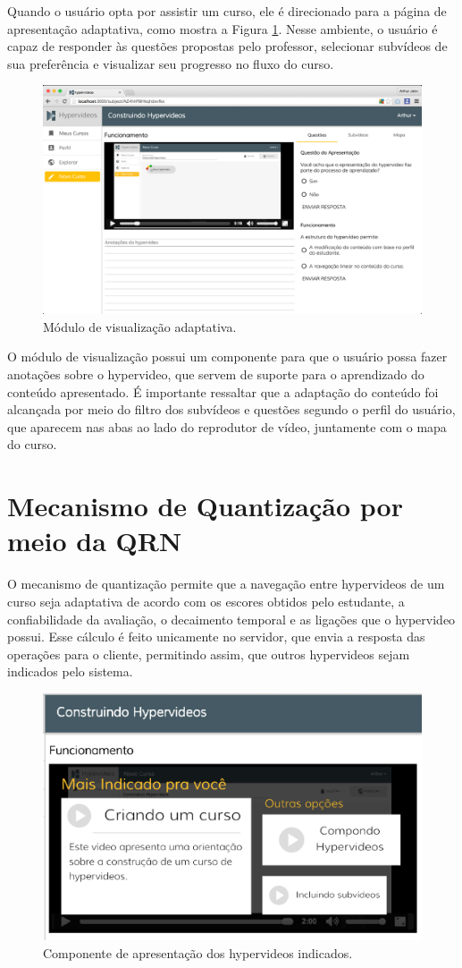 Quando o usuário opta por assistir um curso, ele é direcionado para a página de apresentação adaptativa, como mostra a Figura \ref{fig:apresentar}. Nesse ambiente, o usuário é capaz de responder às questões propostas pelo professor, selecionar subvídeos de sua preferência e visualizar seu progresso no fluxo do curso.

\begin{figure}[h!]
  	\centering
  	\includegraphics[width=.9\linewidth]{figuras/apresentar.eps}
  	\caption{Módulo de visualização adaptativa.}
  	\label{fig:apresentar}
\end{figure}

O módulo de visualização possui um componente para que o usuário possa fazer anotações sobre o hypervideo, que servem de suporte para o aprendizado do conteúdo apresentado. É importante ressaltar que a adaptação do conteúdo foi alcançada por meio do filtro dos subvídeos e questões segundo o perfil do usuário, que aparecem nas abas ao lado do reprodutor de vídeo, juntamente com o mapa do curso.

\section{Mecanismo de Quantização por meio da QRN}

O mecanismo de quantização permite que a navegação entre hypervideos de um curso seja adaptativa de acordo com os escores obtidos pelo estudante, a confiabilidade da avaliação, o decaimento temporal e as ligações que o hypervideo possui. Esse cálculo é feito unicamente no servidor, que envia a resposta das operações para o cliente, permitindo assim, que outros hypervideos sejam indicados pelo sistema. 

\begin{figure}[h!]
  	\centering
  	\includegraphics[width=.5\linewidth]{figuras/quantizacao.eps}
  	\caption{Componente de apresentação dos hypervideos indicados.}
  	\label{fig:quantizacao}
\end{figure}


